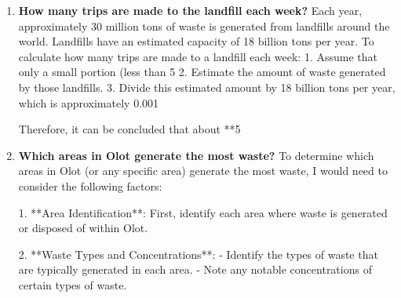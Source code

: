 \begin{enumerate}
5. Limited Maintenance and Service Options: Collection trucks often come with a limited number of maintenance options, making it difficult for drivers to replace worn-out parts on their own.

6. High Cost: Collecting materials over long distances requires efficient transportation methods and proper insurance coverage to cover potential losses.

7. Environmental Impact: Trucks can have a significant environmental footprint due to the energy consumption associated with transporting goods by road.

8. Technical Issues: Drivers may encounter technical issues such as malfunctioning fuel systems or failing sensors, which can affect their productivity and safety on the road.

9. Limited Visibility: During heavy traffic conditions, drivers may not be able to see each other in time to avoid accidents.

10. Maintenance Schedule: Collection truck maintenance schedules are often more rigid than those of other vehicles due to the high volume of cargo being moved.
\item \textbf{How many trips are made to the landfill each week?}
Each year, approximately 30 million tons of waste is generated from landfills around the world. Landfills have an estimated capacity of 18 billion tons per year.
To calculate how many trips are made to a landfill each week:
1. Assume that only a small portion (less than 5%
2. Estimate the amount of waste generated by those landfills.
3. Divide this estimated amount by 18 billion tons per year, which is approximately 0.001%

Therefore, it can be concluded that about **5%
\item \textbf{Which areas in Olot generate the most waste?}
To determine which areas in Olot (or any specific area) generate the most waste, I would need to consider the following factors:

1. **Area Identification**: First, identify each area where waste is generated or disposed of within Olot.

2. **Waste Types and Concentrations**:
   - Identify the types of waste that are typically generated in each area.
   - Note any notable concentrations of certain types of waste.


\end{enumerate}

